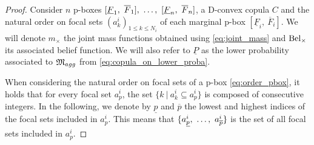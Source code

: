 \begin{proof}
    Consider $n$ p-boxes $[\underline{F}_1,~\overline{F}_1] , ~\dots, ~ [\underline{F}_n,~\overline{F}_n]$, a D-convex copula $C$ and the natural order on focal sets $(a^i_k)_{1\leqslant k \leqslant N_i}$ of each marginal p-box $[\underline{F}_i,~\overline{F}_i]$. We will denote $m_\times$ the joint mass functions obtained using \cref{eq:joint_mass} and $\mathrm{Bel}_\times$ its associated belief function. We will also refer to $\underline{P}$ as the lower probability associated to $\mathfrak{M}_{agg}$ from \cref{eq:copula_on_lower_proba}.

    When considering the natural order on focal sets of a p-box \eqref{eq:order_pbox}, it holds that for every focal set $a^i_p$, the set $\{k~|~a^i_k\subseteq a^i_p\}$ is composed of consecutive integers. In the following, we denote by $\underline{p}$ and $\overline{p}$ the lowest and highest indices of the focal sets included in $a^i_p$. This means that $\{a^i_{\underline{p}} , ~\dots, ~ a^i_{\overline{p}}\}$ is the set of all focal sets included in $a^i_p$. 


\end{proof}
